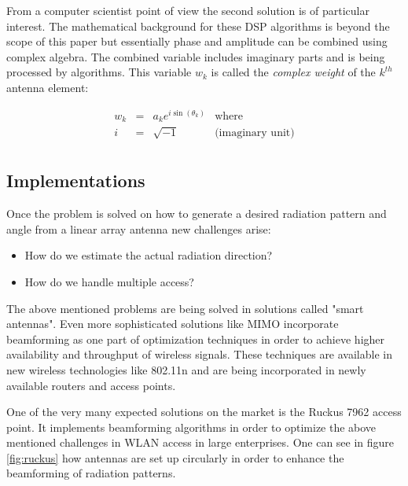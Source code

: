 From a computer scientist point of view the second solution is of particular interest. The mathematical background for these DSP algorithms is beyond the scope of this paper but essentially phase and amplitude can be combined using complex algebra. The combined variable includes imaginary parts and is being processed by algorithms. This variable $w_k$ is called the \emph{complex weight} of the $k^{th}$ antenna element:

\begin{equation}
\begin{array}{rcll}
w_k & = & a_k e^{i \sin(\theta_k)} & \textrm{where} \\
i & = & \sqrt{-1} & \textrm{(imaginary unit)} \\
\end{array}
\end{equation}

\clearpage
\subsection{Implementations}
Once the problem is solved on how to generate a desired radiation pattern and angle from a linear array antenna new challenges arise:

\begin{itemize}
\item How do we estimate the actual radiation direction?
\item How do we handle multiple access?
\end{itemize}

The above mentioned problems are being solved in solutions called "smart antennas". Even more sophisticated solutions like MIMO incorporate beamforming as one part of optimization techniques in order to achieve higher availability and throughput of wireless signals. These techniques are available in new wireless technologies like 802.11n and are being incorporated in newly available routers and access points.

One of the very many expected solutions on the market is the Ruckus 7962 access point. It implements beamforming algorithms in order to optimize the above mentioned challenges in WLAN access in large enterprises. One can see in figure \ref{fig:ruckus} how antennas are set up circularly in order to enhance the beamforming of radiation patterns.

